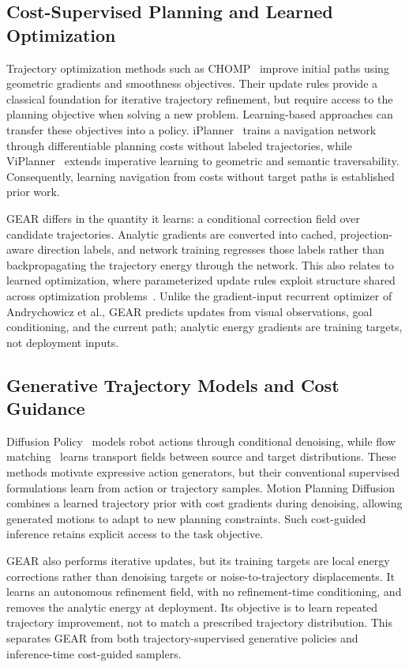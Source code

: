 \documentclass[letterpaper, 10 pt, conference]{ieeeconf}  %
\begin{document}
\subsection{Cost-Supervised Planning and Learned Optimization}

Trajectory optimization methods such as CHOMP~\cite{chomp} improve initial
paths using geometric gradients and smoothness objectives. Their update
rules provide a classical foundation for iterative trajectory refinement,
but require access to the planning objective when solving a new problem.
Learning-based approaches can transfer these objectives into a policy.
iPlanner~\cite{iplanner} trains a navigation network through differentiable
planning costs without labeled trajectories, while ViPlanner~\cite{viplanner}
extends imperative learning to geometric and semantic traversability.
Consequently, learning navigation from costs without target paths is
established prior work.

GEAR differs in the quantity it learns: a conditional correction field
over candidate trajectories. Analytic gradients are converted into cached,
projection-aware direction labels, and network training regresses those
labels rather than backpropagating the trajectory energy through the
network. This also relates to learned optimization, where parameterized
update rules exploit structure shared across optimization
problems~\cite{learnedoptimizer}. Unlike the gradient-input recurrent
optimizer of Andrychowicz et al., GEAR predicts updates from visual
observations, goal conditioning, and the current path; analytic energy
gradients are training targets, not deployment inputs.

\subsection{Generative Trajectory Models and Cost Guidance}

Diffusion Policy~\cite{diffusionpolicy} models robot actions through
conditional denoising, while flow matching~\cite{flowmatching} learns
transport fields between source and target distributions. These methods
motivate expressive action generators, but their conventional supervised
formulations learn from action or trajectory samples. Motion Planning
Diffusion~\cite{mpd} combines a learned trajectory prior with cost
gradients during denoising, allowing generated motions to adapt to new
planning constraints. Such cost-guided inference retains explicit access
to the task objective.

GEAR also performs iterative updates, but its training targets are local
energy corrections rather than denoising targets or noise-to-trajectory
displacements. It learns an autonomous refinement field, with no
refinement-time conditioning, and removes the analytic energy at
deployment. Its objective is to learn repeated trajectory improvement,
not to match a prescribed trajectory distribution. This separates GEAR
from both trajectory-supervised generative policies and inference-time
cost-guided samplers.
\end{document}
